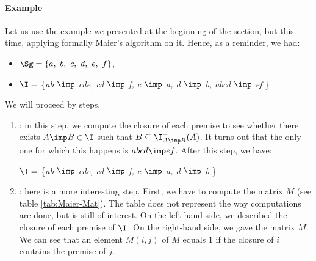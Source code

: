 \vspace{1.2em}

\paragraph{Example} Let us use the example we presented at the beginning of
the section, but this time, applying formally Maier's algorithm on it. Hence,
as a reminder, we had:
\begin{itemize}
	\item $\Sg = \{a, \ b, \ c, \ d, \ e, \ f \}$,
	\item $\I =$ \{\textit{ab $\imp$ cde, cd $\imp$ f, c $\imp$ a, d $\imp$ b, 
		abcd $\imp$ ef} \} 
\end{itemize}
\noindent We will proceed by steps.
\begin{enumerate}
	\item {}: in this step, we compute the closure
	of each premise to see whether there exists $A \imp B \in \I$ such that 
	$B \subseteq \I_{A \imp B}^{-}(A)$. It turns out that the only one for which
	this happens is $abcd \imp ef$. After this step, we have:
	
	\begin{center}
		$\I =$ \{\textit{ab $\imp$ cde, cd $\imp$ f, c $\imp$ a, d $\imp$ b} \} 
	\end{center}
	
	\item {}: here is a more interesting step.
	First, we have to compute the matrix $M$ (see table \ref{tab:Maier-Mat}).
	The table does not represent the way computations are done, but is still of
	interest. On the left-hand side, we described the closure of each premise
	of $\I$. On the right-hand side, we gave the matrix $M$. We can see that
	an element $M(i, j)$ of $M$ equals 1 if the closure of $i$ contains the
	premise of $j$.
	
	\begin{table}[ht]
		\centering
		\quad
\end{table}
\end{enumerate}

